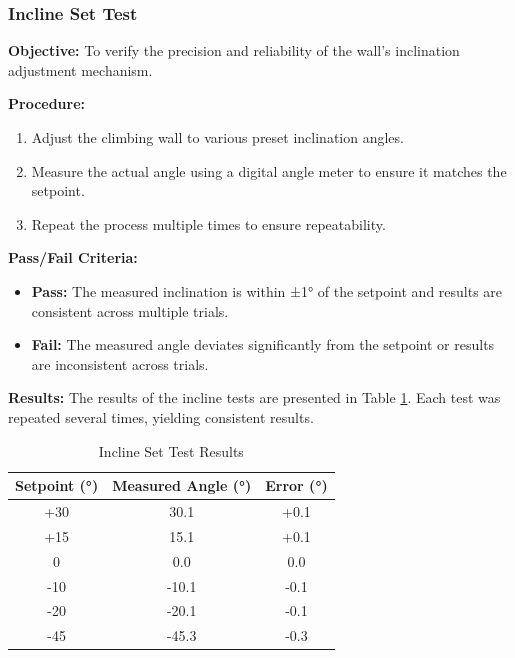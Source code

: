 \subsubsection{Incline Set Test}
\textbf{Objective:} To verify the precision and reliability of the wall's inclination adjustment mechanism.

\textbf{Procedure:}
\begin{enumerate}
    \item Adjust the climbing wall to various preset inclination angles.
    \item Measure the actual angle using a digital angle meter to ensure it matches the setpoint.
    \item Repeat the process multiple times to ensure repeatability.
\end{enumerate}

\textbf{Pass/Fail Criteria:}
\begin{itemize}
    \item \textbf{Pass:} The measured inclination is within ±1° of the setpoint and results are consistent across multiple trials.
    \item \textbf{Fail:} The measured angle deviates significantly from the setpoint or results are inconsistent across trials.
\end{itemize}

\textbf{Results:}
The results of the incline tests are presented in Table \ref{tab:incline_test}. Each test was repeated several times, yielding consistent results.

\begin{table}[H]
\centering
\caption{Incline Set Test Results}
\label{tab:incline_test}
\begin{tabular}{|c|c|c|}
\hline
\textbf{Setpoint (°)} & \textbf{Measured Angle (°)} & \textbf{Error (°)} \\ \hline
+30                  & 30.1                       & +0.1               \\ \hline
+15                  & 15.1                       & +0.1               \\ \hline
0                    & 0.0                        & 0.0                \\ \hline
-10                  & -10.1                      & -0.1               \\ \hline
-20                  & -20.1                      & -0.1               \\ \hline
-45                  & -45.3                      & -0.3               \\ \hline
\end{tabular}
\end{table}


